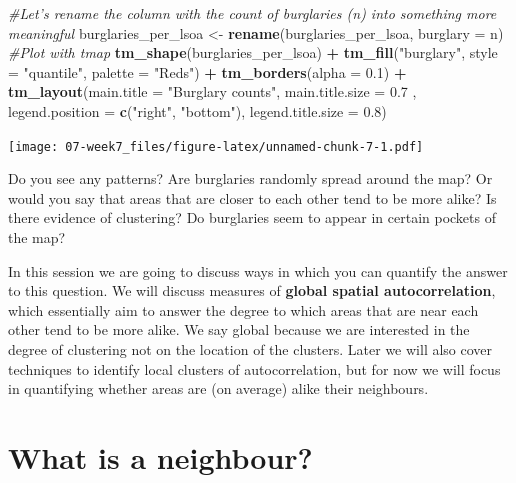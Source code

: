 \documentclass[]{book}
\newenvironment{Shaded}{\begin{snugshade}}{\end{snugshade}}
\newcommand{\CommentTok}[1]{\textcolor[rgb]{0.56,0.35,0.01}{\textit{#1}}}
\newcommand{\DataTypeTok}[1]{\textcolor[rgb]{0.13,0.29,0.53}{#1}}
\newcommand{\FloatTok}[1]{\textcolor[rgb]{0.00,0.00,0.81}{#1}}
\newcommand{\KeywordTok}[1]{\textcolor[rgb]{0.13,0.29,0.53}{\textbf{#1}}}
\newcommand{\NormalTok}[1]{#1}
\newcommand{\OperatorTok}[1]{\textcolor[rgb]{0.81,0.36,0.00}{\textbf{#1}}}
\newcommand{\StringTok}[1]{\textcolor[rgb]{0.31,0.60,0.02}{#1}}
\begin{document}
\begin{Shaded}
\begin{Highlighting}[]
\CommentTok{#Let's rename the column with the count of burglaries (n) into something more meaningful}
\NormalTok{burglaries_per_lsoa <-}\StringTok{ }\KeywordTok{rename}\NormalTok{(burglaries_per_lsoa, }\DataTypeTok{burglary =}\NormalTok{ n)}
\CommentTok{#Plot with tmap}
\KeywordTok{tm_shape}\NormalTok{(burglaries_per_lsoa) }\OperatorTok{+}\StringTok{ }
\StringTok{  }\KeywordTok{tm_fill}\NormalTok{(}\StringTok{"burglary"}\NormalTok{, }\DataTypeTok{style =} \StringTok{"quantile"}\NormalTok{, }\DataTypeTok{palette =} \StringTok{"Reds"}\NormalTok{) }\OperatorTok{+}
\StringTok{  }\KeywordTok{tm_borders}\NormalTok{(}\DataTypeTok{alpha =} \FloatTok{0.1}\NormalTok{) }\OperatorTok{+}
\StringTok{  }\KeywordTok{tm_layout}\NormalTok{(}\DataTypeTok{main.title =} \StringTok{"Burglary counts"}\NormalTok{, }\DataTypeTok{main.title.size =} \FloatTok{0.7}\NormalTok{ ,}
            \DataTypeTok{legend.position =} \KeywordTok{c}\NormalTok{(}\StringTok{"right"}\NormalTok{, }\StringTok{"bottom"}\NormalTok{), }\DataTypeTok{legend.title.size =} \FloatTok{0.8}\NormalTok{)}
\end{Highlighting}
\end{Shaded}

\texttt{[image: 07-week7\_files/figure-latex/unnamed-chunk-7-1.pdf]}

Do you see any patterns? Are burglaries randomly spread around the map? Or would you say that areas that are closer to each other tend to be more alike? Is there evidence of clustering? Do burglaries seem to appear in certain pockets of the map?

In this session we are going to discuss ways in which you can quantify the answer to this question. We will discuss measures of \textbf{global spatial autocorrelation}, which essentially aim to answer the degree to which areas that are near each other tend to be more alike. We say global because we are interested in the degree of clustering not on the location of the clusters. Later we will also cover techniques to identify local clusters of autocorrelation, but for now we will focus in quantifying whether areas are (on average) alike their neighbours.

\hypertarget{what-is-a-neighbour}{%
\section{What is a neighbour?}\label{what-is-a-neighbour}}
\end{document}

